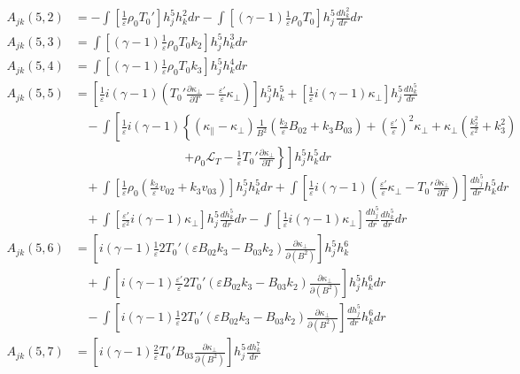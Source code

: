 \documentclass[11pt, fleqn]{article}
\newcommand{\HL}{\mathscr{L}}
\newcommand{\eps}{\varepsilon}
\begin{document}
\begin{align*}
	A_{jk}(5, 2) &= -\int \left[\frac{1}{\eps}\rho_0T_0'\right] h_j^5h_k^2 dr - \int \left[(\gamma - 1)\frac{1}{\eps}\rho_0T_0\right] h_j^5\frac{dh_k^2}{dr} dr	\\
	A_{jk}(5, 3) &=  \int \left[(\gamma - 1)\frac{1}{\eps}\rho_0T_0k_2\right] h_j^5 h_k^3 dr															\\
	A_{jk}(5, 4) &=  \int \left[(\gamma - 1)\frac{1}{\eps}\rho_0T_0k_3\right] h_j^5 h_k^4 dr															\\
	A_{jk}(5, 5) &=  \left[\frac{1}{\eps}i(\gamma - 1)\left(T_0'\frac{\partial \kappa_\bot}{\partial T} - \frac{\eps'}{\eps}\kappa_\bot\right)\right] h_j^5 h_k^5 + \left[\frac{1}{\eps}i(\gamma - 1)\kappa_\bot\right]h_j^5 \frac{dh_k^5}{dr} 			\\
				 &~~~~ -\int \left[\frac{1}{\eps}i(\gamma - 1)\left\{(\kappa_\parallel - \kappa_\bot)\frac{1}{B^2}\left(\frac{k_2}{\eps}B_{02} + k_3B_{03}\right) + \left(\frac{\eps'}{\eps}\right)^2\kappa_\bot
				 																																								   + \kappa_\bot\left(\frac{k_2^2}{\eps^2} + k_3^2\right)\right.\right. \\
				 &\qquad\qquad\qquad\qquad~~~~ 									  \left.\left.+ \rho_0\HL_T - \frac{1}{\eps}T_0'\frac{\partial \kappa_\bot}{\partial T}\right\} \right] h_j^5h_k^5 dr													\\
				 &~~~~ +\int \left[\frac{1}{\eps}\rho_0\left(\frac{k_2}{\eps}v_{02} + k_3v_{03}\right)\right] h_j^5 h_k^5 dr 
				 	   +\int\left[\frac{1}{\eps}i(\gamma - 1)\left(\frac{\eps'}{\eps}\kappa_\bot - T_0'\frac{\partial \kappa_\bot}{\partial T}\right)\right] \frac{dh_j^5}{dr} h_k^5 dr																	\\
				 &~~~~ +\int\left[\frac{\eps'}{\eps^2}i(\gamma - 1)\kappa_\bot\right] h_j^5 \frac{dh_k^5}{dr} dr - \int \left[\frac{1}{\eps}i(\gamma - 1)\kappa_\bot\right] \frac{dh_j^5}{dr}\frac{dh_k^5}{dr} dr										\\
	A_{jk}(5, 6) &=  \left[i(\gamma - 1)\frac{1}{\eps}2T_0'(\eps B_{02}k_3 - B_{03}k_2)\frac{\partial \kappa_\bot}{\partial(B^2)}\right] h_j^5 h_k^6	\\
				 &~~~~ + \int \left[i(\gamma - 1)\frac{\eps'}{\eps}2T_0'(\eps B_{02}k_3 - B_{03}k_2)\frac{\partial \kappa_\bot}{\partial(B^2)}\right] h_j^5 h_k^6 dr																					\\
				 &~~~~ - \int \left[i(\gamma - 1)\frac{1}{\eps}2T_0'(\eps B_{02}k_3 - B_{03}k_2)\frac{\partial \kappa_\bot}{\partial(B^2)}\right] \frac{dh_j^5}{dr} h_k^6 dr																			\\
	A_{jk}(5, 7) &=  \left[i(\gamma - 1)\frac{2}{\eps}T_0'B_{03}\frac{\partial \kappa_\bot}{\partial(B^2)}\right] h_j^5 \frac{dh_k^7}{dr} 

\end{align*}
\end{document}
